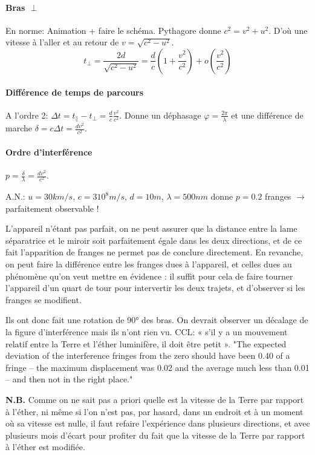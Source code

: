 \documentclass[11pt]{report}
\numberwithin{figure}{section}
\numberwithin{equation}{section}
\numberwithin{table}{section}
\newcommand{\1}{\boldsymbol{1}}
\begin{document}
\paragraph{Bras $\perp$}
En norme: Animation + faire le schéma. Pythagore donne $c^2 = v^2 + u^2$. D'où une vitesse à l'aller et au retour de $v = \sqrt{c^2 - u^2}$.
\begin{equation}
t_{\perp} =  \frac{2d}{\sqrt{c^2 - u^2}} = \frac{d}{c} \left(1 + \frac{v^2}{c^2}\right) + o\left(\frac{v^2}{c^2}\right)
\end{equation}

\paragraph{Différence de temps de parcours}
A l'ordre 2: $\Delta t = t_{\parallel} - t_{\perp} = \frac{d}{c} \frac{v^2}{c^2}$. Donne un déphasage $\varphi = \frac{2\pi}{\lambda}$ et une différence de marche $\delta = c \Delta t = \frac{d v^2}{c^2}$.

\paragraph{Ordre d'interférence}

$p = \frac{\delta}{\lambda} = \frac{d v^2}{c^2}$.

A.N.: $u = 30km/s$, $c = 3 10^8 m/s$, $d = 10m$, $\lambda = 500nm$ donne $p = 0.2$ franges $\rightarrow$ parfaitement observable !

L'appareil n'étant pas parfait, on ne peut assurer que la distance entre la lame séparatrice et le miroir soit parfaitement égale dans les deux directions, et de ce fait l'apparition de franges ne permet pas de conclure directement. En revanche, on peut faire la différence entre les franges dues à l'appareil, et celles dues au phénomène qu'on veut mettre en évidence : il suffit pour cela de faire tourner l'appareil d'un quart de tour pour intervertir les deux trajets, et d'observer si les franges se modifient.

Ils ont donc fait une rotation de 90° des bras. On devrait observer un décalage de la figure d'interférence mais ils n'ont rien vu. CCL: « s'il y a un mouvement relatif entre la Terre et l'éther luminifère, il doit être petit ». "The expected deviation of the interference fringes from the zero should have been 0.40 of a fringe – the maximum displacement was 0.02 and the average much less than 0.01 – and then not in the right place."

\textbf{N.B.} Comme on ne sait pas a priori quelle est la vitesse de la Terre par rapport à l'éther, ni même si l'on n'est pas, par hasard, dans un endroit et à un moment où sa vitesse est nulle, il faut refaire l'expérience dans plusieurs directions, et avec plusieurs mois d'écart pour profiter du fait que la vitesse de la Terre par rapport à l'éther est modifiée.
\end{document}
